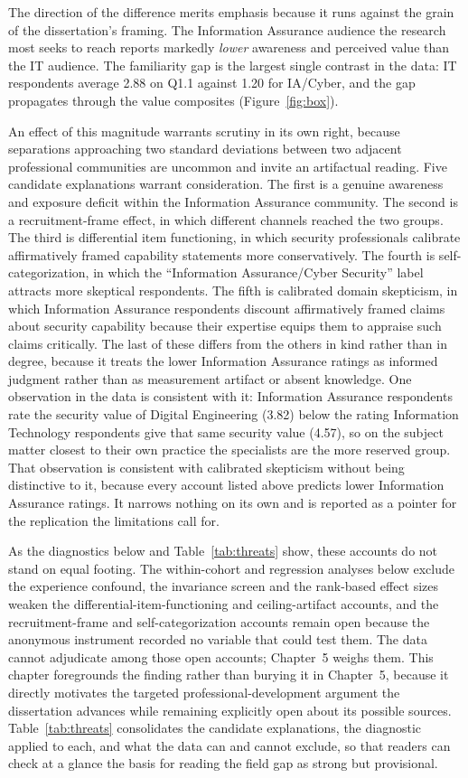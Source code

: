 The direction of the difference merits emphasis because it runs against the grain of the dissertation's framing. The Information Assurance audience the research most seeks to reach reports markedly \emph{lower} awareness and perceived value than the IT audience. The familiarity gap is the largest single contrast in the data: IT respondents average 2.88 on Q1.1 against 1.20 for IA/Cyber, and the gap propagates through the value composites (Figure~\ref{fig:box}).

An effect of this magnitude warrants scrutiny in its own right, because separations approaching two standard deviations between two adjacent professional communities are uncommon and invite an artifactual reading. Five candidate explanations warrant consideration. The first is a genuine awareness and exposure deficit within the Information Assurance community. The second is a recruitment-frame effect, in which different channels reached the two groups. The third is differential item functioning, in which security professionals calibrate affirmatively framed capability statements more conservatively. The fourth is self-categorization, in which the ``Information Assurance/Cyber Security'' label attracts more skeptical respondents. The fifth is calibrated domain skepticism, in which Information Assurance respondents discount affirmatively framed claims about security capability because their expertise equips them to appraise such claims critically. The last of these differs from the others in kind rather than in degree, because it treats the lower Information Assurance ratings as informed judgment rather than as measurement artifact or absent knowledge. One observation in the data is consistent with it: Information Assurance respondents rate the security value of Digital Engineering (3.82) below the rating Information Technology respondents give that same security value (4.57), so on the subject matter closest to their own practice the specialists are the more reserved group. That observation is consistent with calibrated skepticism without being distinctive to it, because every account listed above predicts lower Information Assurance ratings. It narrows nothing on its own and is reported as a pointer for the replication the limitations call for.

As the diagnostics below and Table~\ref{tab:threats} show, these accounts do not stand on equal footing. The within-cohort and regression analyses below exclude the experience confound, the invariance screen and the rank-based effect sizes weaken the differential-item-functioning and ceiling-artifact accounts, and the recruitment-frame and self-categorization accounts remain open because the anonymous instrument recorded no variable that could test them. The data cannot adjudicate among those open accounts; Chapter~5 weighs them. This chapter foregrounds the finding rather than burying it in Chapter~5, because it directly motivates the targeted professional-development argument the dissertation advances while remaining explicitly open about its possible sources. Table~\ref{tab:threats} consolidates the candidate explanations, the diagnostic applied to each, and what the data can and cannot exclude, so that readers can check at a glance the basis for reading the field gap as strong but provisional.

